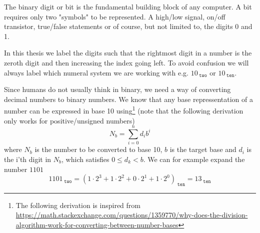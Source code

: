     The binary digit or bit is the fundamental building block of any computer. A bit requires only two "symbols" to be represented. A high/low signal, on/off transistor, true/false statements or of course, but not limited to, the digits 0 and 1.
    
    In this thesis we label the digits such that the rightmost digit in a number is the zeroth digit and then increasing the index going left. To avoid confusion we will always label which numeral system we are working with e.g. $10_{\;\texttt{two}}$ or $10_{\;\texttt{ten}}$.
    
    Since humans do not usually think in binary, we need a way of converting decimal numbers to binary numbers. We know that any base repressentation of a number can be expressed in base 10 using\footnote{The following derivation is inspired from \\\url{https://math.stackexchange.com/questions/1359770/why-does-the-division-algorithm-work-for-converting-between-number-bases}} (note that the following derivation only works for positive/unsigned numbers) 
    \begin{equation}\label{Eq:baseXToDecimal}
        N_b = \sum_{i=0}^{n} d_i b^i
    \end{equation}
    where $N_b$ is the number to be converted to base 10, $b$ is the target base and $d_i$ is the i'th digit in $N_b$, which satisfies $0 \leq d_k < b$. We can for example expand the number $1101$
    \begin{equation}\label{Eq:bintodecimal}
        1101_{\;\texttt{two}} = (1 \cdot 2^3 + 1 \cdot 2^2 + 0\cdot 2^1 + 1\cdot 2^0)_{\;\texttt{ten}} = 13_{\;\texttt{ten}}
    \end{equation}
    
